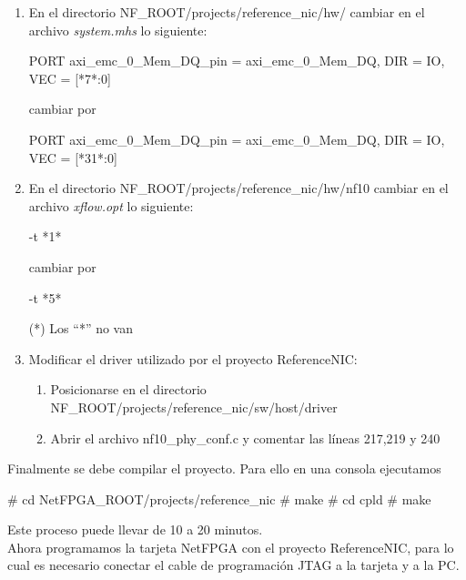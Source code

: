\begin{enumerate}

\item En el directorio NF\_ROOT/projects/reference\_nic/hw/ cambiar en el archivo \textit{system.mhs} lo siguiente:

\begin{bash}
PORT axi_emc_0_Mem_DQ_pin = axi_emc_0_Mem_DQ, DIR = IO, 
VEC = [*7*:0]
\end{bash}

cambiar por

\begin{bash}
PORT axi_emc_0_Mem_DQ_pin = axi_emc_0_Mem_DQ, DIR = IO, 
VEC = [*31*:0]
\end{bash}

\item En el directorio NF\_ROOT/projects/reference\_nic/hw/nf10 cambiar en el archivo \textit{xflow.opt} lo siguiente: 

\begin{bash}
-t *1*
\end{bash}

cambiar por

\begin{bash}
-t *5*
\end{bash}

(*) Los “*” no van

\item Modificar el driver utilizado por el proyecto ReferenceNIC:
\begin{enumerate}
\item Posicionarse en el directorio NF\_ROOT/projects/reference\_nic/sw/host/driver
\item Abrir el archivo nf10\_phy\_conf.c y comentar las líneas 217,219 y 240
\end{enumerate}

\end{enumerate}

Finalmente se debe compilar el proyecto. Para ello en una consola ejecutamos

\begin{bash}
# cd NetFPGA_ROOT/projects/reference_nic
# make
# cd cpld
# make
\end{bash}

Este proceso puede llevar de 10 a 20 minutos.\\

Ahora programamos la tarjeta NetFPGA con el proyecto ReferenceNIC, para lo cual es necesario conectar el cable de programación JTAG a la tarjeta y a la PC.\\

